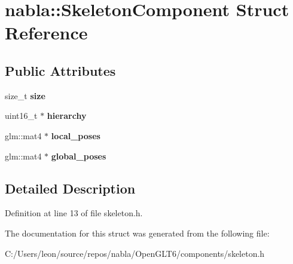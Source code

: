 \hypertarget{structnabla_1_1_skeleton_component}{}\section{nabla\+::Skeleton\+Component Struct Reference}
\label{structnabla_1_1_skeleton_component}
\subsection*{Public Attributes}
\begin{DoxyCompactItemize}
\item 
\mbox{\label{structnabla_1_1_skeleton_component_a5f113384ea68640232b3d2c303217993}} 
size\+\_\+t {\bfseries size}
\item 
\mbox{\label{structnabla_1_1_skeleton_component_a5664ecbfd1f97d8562214f68f828ee9d}} 
uint16\+\_\+t $\ast$ {\bfseries hierarchy}
\item 
\mbox{\label{structnabla_1_1_skeleton_component_abdfefff89b0414135c1ff87fbe9b390c}} 
glm\+::mat4 $\ast$ {\bfseries local\+\_\+poses}
\item 
\mbox{\label{structnabla_1_1_skeleton_component_af41106e538a58ab213492c831ad9669c}} 
glm\+::mat4 $\ast$ {\bfseries global\+\_\+poses}
\end{DoxyCompactItemize}


\subsection{Detailed Description}


Definition at line 13 of file skeleton.\+h.



The documentation for this struct was generated from the following file\+:\begin{DoxyCompactItemize}
\item 
C\+:/\+Users/leon/source/repos/nabla/\+Open\+G\+L\+T6/components/skeleton.\+h\end{DoxyCompactItemize}
